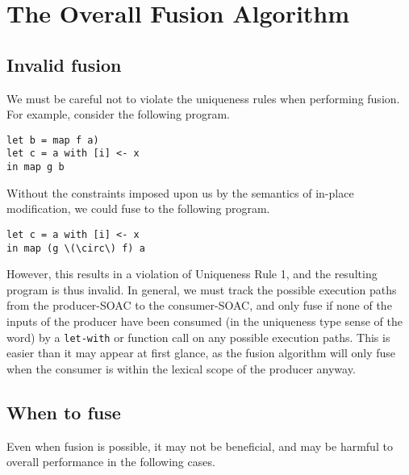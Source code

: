 \section{The Overall Fusion Algorithm}

\subsection{Invalid fusion}
\label{sec:invalidfusion}

We must be careful not to violate the uniqueness rules when performing
fusion.  For example, consider the following program.

\begin{lstlisting}
let b = map f a)
let c = a with [i] <- x
in map g b
\end{lstlisting}

Without the constraints imposed upon us by the semantics of in-place
modification, we could fuse to the following program.

\begin{lstlisting}[mathescape]
let c = a with [i] <- x
in map (g \(\circ\) f) a
\end{lstlisting}

However, this results in a violation of Uniqueness Rule 1, and the
resulting program is thus invalid.  In general, we must track the
possible execution paths from the producer-SOAC to the consumer-SOAC,
and only fuse if none of the inputs of the producer have been consumed
(in the uniqueness type sense of the word) by a \lstinline{let-with} or
function call on any possible execution paths.  This is easier than it
may appear at first glance, as the fusion algorithm will only fuse
when the consumer is within the lexical scope of the producer anyway.

\subsection{When to fuse}
\label{sec:whentofuse}

Even when fusion is possible, it may not be beneficial, and may be
harmful to overall performance in the following cases.

